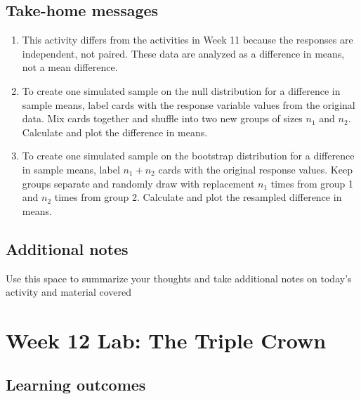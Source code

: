 \documentclass[
]{report}
\begin{document}
\vspace{1in}

\hypertarget{take-home-messages-5}{%
\subsection{Take-home messages}\label{take-home-messages-5}}

\begin{enumerate}
\def\labelenumi{\arabic{enumi}.}
\item
  This activity differs from the activities in Week 11 because the responses are independent, not paired. These data are analyzed as a difference in means, not a mean difference.
\item
  To create one simulated sample on the null distribution for a difference in sample means, label cards with the response variable values from the original data. Mix cards together and shuffle into two new groups of sizes \(n_1\) and \(n_2\). Calculate and plot the difference in means.
\item
  To create one simulated sample on the bootstrap distribution for a difference in sample means, label \(n_1 + n_2\) cards with the original response values. Keep groups separate and randomly draw with replacement \(n_1\) times from group 1 and \(n_2\) times from group 2. Calculate and plot the resampled difference in means.
\end{enumerate}

\hypertarget{additional-notes-5}{%
\subsection{Additional notes}\label{additional-notes-5}}

Use this space to summarize your thoughts and take additional notes on today's activity and material covered

\newpage

\hypertarget{week-12-lab-the-triple-crown}{%
\section{Week 12 Lab: The Triple Crown}\label{week-12-lab-the-triple-crown}}


\hypertarget{learning-outcomes-7}{%
\subsection{Learning outcomes}\label{learning-outcomes-7}}
\end{document}

